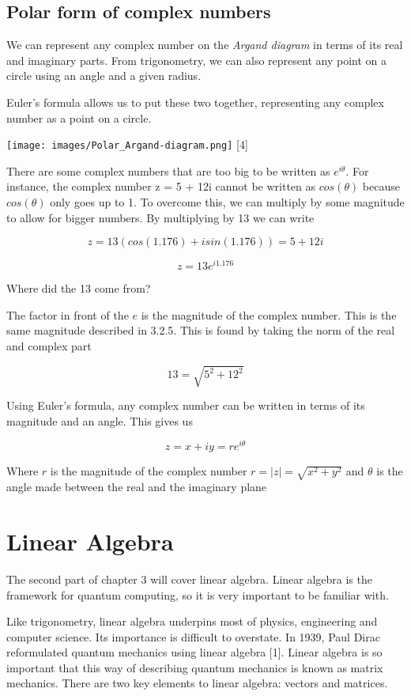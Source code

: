 \documentclass{book}
\begin{document}
\subsection{ Polar form of complex numbers}

We can represent any complex number on the \textit{Argand diagram} in terms of its real and imaginary parts. From trigonometry, we can also represent any point on a circle using an angle and a given radius. 

Euler's formula allows us to put these two together, representing any complex number as a point on a circle. 

\texttt{[image: images/Polar\_Argand-diagram.png]}
[4]

There are some complex numbers that are too big to be written as $e^{i\theta}$. For instance, the complex number z = 5 + 12i cannot be written as $cos(\theta)$ because $cos(\theta)$ only goes up to 1. To overcome this, we can multiply by some magnitude to allow for bigger numbers. By multiplying by 13 we can write 

$$ z = 13(cos(1.176) + i sin(1.176) )= 5 + 12i $$

$$ z = 13e^{i 1.176}$$

Where did the 13 come from? 

The factor in front of the $e$ is the magnitude of the complex number. This is the same magnitude described in 3.2.5. This is found by taking the norm of the real and complex part 

$$ 13 = \sqrt{ 5^2 + 12^2} $$

Using Euler's formula, any complex number can be written in terms of its magnitude and an angle. This gives us 

$$z = x + iy = re^{i\theta}$$ 

Where $r$ is the magnitude of the complex number $r = |z| = \sqrt{x^2 + y^2}$ and $\theta$ is the angle made between the real and the imaginary plane

\section{Linear Algebra}

The second part of chapter 3 will cover linear algebra. Linear algebra is the framework for quantum computing, so it is very important to be familiar with. 

Like trigonometry, linear algebra underpins most of physics, engineering and computer science. Its importance is difficult to overstate. In 1939, Paul Dirac reformulated quantum mechanics using linear algebra [1]. Linear algebra is so important that this way of describing quantum mechanics is known as matrix mechanics. There are two key elements to linear algebra: vectors and matrices. 
\end{document}
